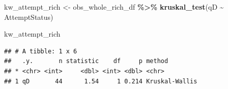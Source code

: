\documentclass[
]{article}
\newenvironment{Shaded}{\begin{snugshade}}{\end{snugshade}}
\newcommand{\FunctionTok}[1]{\textcolor[rgb]{0.13,0.29,0.53}{\textbf{#1}}}
\newcommand{\NormalTok}[1]{#1}
\newcommand{\OtherTok}[1]{\textcolor[rgb]{0.56,0.35,0.01}{#1}}
\newcommand{\SpecialCharTok}[1]{\textcolor[rgb]{0.81,0.36,0.00}{\textbf{#1}}}
\begin{document}
\begin{Shaded}
\begin{Highlighting}[]
\NormalTok{kw\_attempt\_rich }\OtherTok{\textless{}{-}} 
\NormalTok{  obs\_whole\_rich\_df }\SpecialCharTok{\%\textgreater{}\%}
  \FunctionTok{kruskal\_test}\NormalTok{(qD }\SpecialCharTok{\textasciitilde{}}\NormalTok{ AttemptStatus)}

\NormalTok{kw\_attempt\_rich}
\end{Highlighting}
\end{Shaded}

\begin{verbatim}
## # A tibble: 1 x 6
##   .y.       n statistic    df     p method        
## * <chr> <int>     <dbl> <int> <dbl> <chr>         
## 1 qD       44      1.54     1 0.214 Kruskal-Wallis
\end{verbatim}
\end{document}
